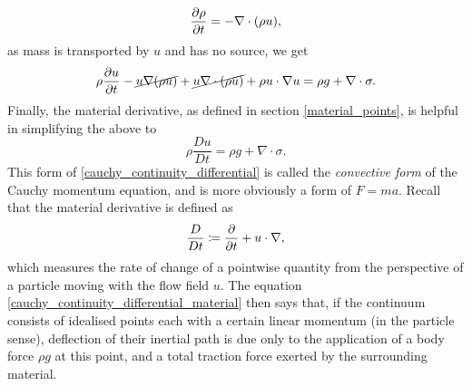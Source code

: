 $$\frac{\partial \rho}{\partial t} = -\nabla\cdot(\rho u),$$
as mass is transported by $u$ and has no source, we get
$$
    \rho\frac{\partial u}{\partial t} -\cancel{u\nabla(\rho u)} + \cancel{u\nabla\cdot (\rho u)} + \rho u\cdot\nabla u = \rho g + \nabla\cdot\sigma.
$$
Finally, the material derivative, as defined in section \ref{material_points}, is helpful in simplifying the above to
\begin{equation}\label{cauchy_continuity_differential_material}
    \rho\frac{Du}{Dt} = \rho g + \nabla\cdot\sigma.
\end{equation}
This form of \eqref{cauchy_continuity_differential} is called the \textit{convective form} of the Cauchy momentum equation, and is more obviously a form of $F = ma$.
Recall that the material derivative is defined as
    $$\frac{D}{Dt} \coloneqq \frac{\partial }{\partial t} + u\cdot \nabla,$$
which measures the rate of change of a pointwise quantity from the perspective of a particle moving with the flow field $u$.
The equation \eqref{cauchy_continuity_differential_material} then says that, if the continuum consists of idealised points
each with a certain linear momentum (in the particle sense), deflection of their inertial path is due only to the application
of a body force $\rho g$ at this point, and a total traction force exerted by the surrounding material.
